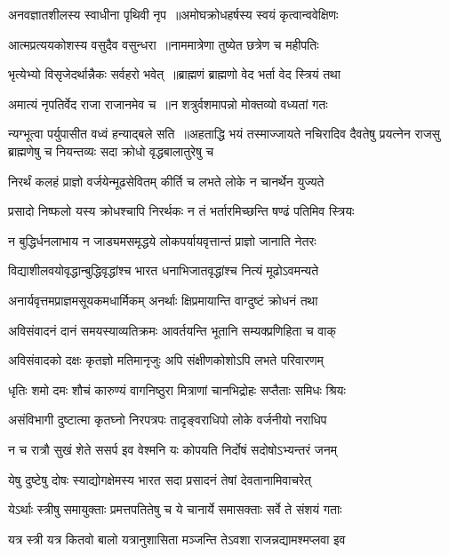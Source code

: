 \twolineshloka
{अनवज्ञातशीलस्य स्वाधीना पृथिवी नृप ॥अमोघक्रोधहर्षस्य स्वयं कृत्वान्ववेक्षिणः}
{}


\twolineshloka
{आत्मप्रत्ययकोशस्य वसुदैव वसुन्धरा ॥नाममात्रेणा तुष्येत छत्रेण च महीपतिः}
{}


\twolineshloka
{भृत्येभ्यो विसृजेदर्थान्नैकः सर्वहरो भवेत् ॥ब्राह्मणं ब्राह्मणो वेद भर्ता वेद स्त्रियं तथा}
{}


\twolineshloka
{अमात्यं नृपतिर्वेद राजा राजानमेव च ॥न शत्रुर्वशमापन्नो मोक्तव्यो वध्यतां गतः}
{}


न्यग्भूत्वा पर्युपासीत वध्वं हन्याद्बले सति ॥अहताद्धि भयं तस्माज्जायते नचिरादिव
\twolineshloka
{दैवतेषु प्रयत्नेन राजसु ब्राह्मणेषु च}
{नियन्तव्यः सदा क्रोधो वृद्धबालातुरेषु च}


\twolineshloka
{निरर्थं कलहं प्राज्ञो वर्जयेन्मूढसेवितम्}
{कीर्ति च लभते लोके न चानर्थेन युज्यते}


\twolineshloka
{प्रसादो निष्फलो यस्य क्रोधश्चापि निरर्थकः}
{न तं भर्तारमिच्छन्ति षण्ढं पतिमिव स्त्रियः}


\twolineshloka
{न बुद्धिर्धनलाभाय न जाड्यमसमृद्धये}
{लोकपर्यायवृत्तान्तं प्राज्ञो जानाति नेतरः}


\twolineshloka
{विद्याशीलवयोवृद्धान्बुद्धिवृद्धांश्च भारत}
{धनाभिजातवृद्धांश्च नित्यं मूढोऽवमन्यते}


\twolineshloka
{अनार्यवृत्तमप्राज्ञमसूयकमधार्मिकम्}
{अनर्थाः क्षिप्रमायान्ति वाग्दुष्टं क्रोधनं तथा}


\twolineshloka
{अविसंवादनं दानं समयस्याव्यतिक्रमः}
{आवर्तयन्ति भूतानि सम्यक्प्रणिहिता च वाक्}


\twolineshloka
{अविसंवादको दक्षः कृतज्ञो मतिमानृजुः}
{अपि संक्षीणकोशोऽपि लभते परिवारणम्}


\twolineshloka
{धृतिः शमो दमः शौचं कारुण्यं वागनिष्ठुरा}
{मित्राणां चानभिद्रोहः सप्तैताः समिधः श्रियः}


\twolineshloka
{असंविभागी दुष्टात्मा कृतघ्नो निरपत्रपः}
{तादृङ्वराधिपो लोके वर्जनीयो नराधिप}


\twolineshloka
{न च रात्रौ सुखं शेते ससर्प इव वेश्मनि}
{यः कोपयति निर्दोषं सदोषोऽभ्यन्तरं जनम्}


\twolineshloka
{येषु दुष्टेषु दोषः स्याद्योगक्षेमस्य भारत}
{सदा प्रसादनं तेषां देवतानामिवाचरेत्}


\twolineshloka
{येऽर्थाः स्त्रीषु समायुक्ताः प्रमत्तपतितेषु च}
{ये चानार्ये समासक्ताः सर्वे ते संशयं गताः}


\twolineshloka
{यत्र स्त्री यत्र कितवो बालो यत्रानुशासिता}
{मञ्जन्ति तेऽवशा राजन्नद्यामश्मप्लवा इव}


